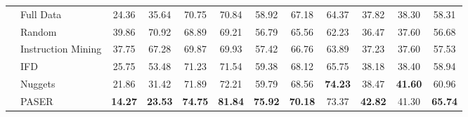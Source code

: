 \begin{table*}[h]
{\begin{tabular}{ll:cc:ccccccc:c}
& Full Data & 24.36 & 35.64 & 70.75 & 70.84 & 58.92 & 67.18 & 64.37 & 37.82 & 38.30 & 58.31  \\
& Random & 39.86 & 70.92 & 68.89 & 69.21 & 56.79 & 65.56 & 62.23 & 36.47 & 37.60 & 56.68 \\
& Instruction Mining & 37.75 & 67.28 & 69.87 & 69.93 & 57.42 & 66.76 & 63.89 & 37.23 & 37.60 & 57.53  \\
& IFD & 25.75 & 53.48 & 71.23 & 71.54 & 59.38 & 68.12 & 65.75 & 38.18 & 38.40 & 58.94 \\
& Nuggets & 21.86 & 31.42 & 71.89 & 72.21 & 59.79 & 68.56 & \textbf{74.23} & 38.47 & \textbf{41.60} & 60.96   \\
& PASER  & \textbf{14.27} & \textbf{23.53} & \textbf{74.75} & \textbf{81.84} & \textbf{75.92} & \textbf{70.18} & 73.37 & \textbf{42.82} & 41.30 & \textbf{65.74}  \\
\hline
\bottomrule
\end{tabular}}
\label{tab: different datasets}
\end{table*}



